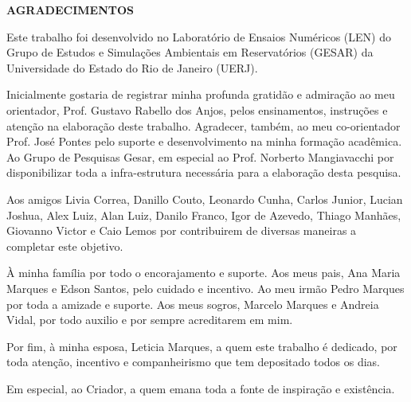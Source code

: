 \begin{center}
\textbf{AGRADECIMENTOS}
\end{center}
$\!$\\

\medskip 
Este trabalho foi desenvolvido no Laboratório de Ensaios Numéricos (LEN)
do Grupo de Estudos e Simulações Ambientais em Reservatórios (GESAR) da
Universidade do Estado do Rio de Janeiro (UERJ).

\medskip 
Inicialmente gostaria de registrar minha profunda gratidão e admiração ao meu
orientador, Prof. Gustavo Rabello dos Anjos, pelos ensinamentos, instruções e atenção
na elaboração deste trabalho.
Agradecer, também, ao meu co-orientador Prof. José Pontes pelo suporte e desenvolvimento na 
minha formação acadêmica.
Ao Grupo de Pesquisas Gesar, em especial ao Prof. Norberto Mangiavacchi por disponibilizar toda a infra-estrutura
necessária para a elaboração desta pesquisa.

\medskip 
Aos amigos Livia Correa, Danillo Couto, Leonardo Cunha, Carlos Junior, Lucian Joshua, Alex Luiz,
Alan Luiz, Danilo Franco, Igor de Azevedo, Thiago Manhães,
Giovanno Victor e Caio Lemos por contribuirem de diversas maneiras a completar este objetivo.

\medskip 
À minha família por todo o encorajamento e suporte. 
Aos meus pais, Ana Maria Marques e Edson Santos, pelo cuidado
e incentivo. Ao meu irmão Pedro Marques por toda a amizade e
suporte. Aos meus sogros, Marcelo Marques e Andreia Vidal,
por todo auxilio e por sempre acreditarem em mim.

\medskip 
Por fim, à minha esposa, Leticia Marques, a quem este trabalho é dedicado,
por toda atenção, incentivo e companheirismo que tem depositado todos os
dias.

\medskip 
Em especial, ao Criador, a quem emana toda a fonte de inspiração e existência.
